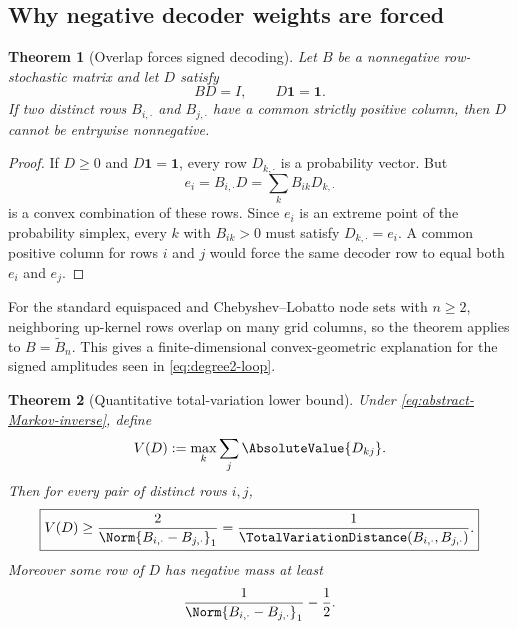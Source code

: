 \documentclass[11pt,oneside]{article}
\numberwithin{equation}{section}
\newtheorem{theorem}{Theorem}[section]
\theoremstyle{definition}
\theoremstyle{remark}
\begin{document}
\subsection{Why negative decoder weights are forced}

\begin{theorem}[Overlap forces signed decoding]
\label{thm:sign-necessity}
Let $B$ be a nonnegative row-stochastic matrix and let $D$ satisfy
\begin{equation}
 BD=I,
 \qquad D\bm1=\bm1.
 \label{eq:abstract-Markov-inverse}
\end{equation}
If two distinct rows $B_{i,\cdot}$ and $B_{j,\cdot}$ have a common strictly
positive column, then $D$ cannot be entrywise nonnegative.
\end{theorem}

\begin{proof}
If $D\ge0$ and $D\bm1=\bm1$, every row $D_{k,\cdot}$ is a probability
vector.  But
\[
 e_i=B_{i,\cdot}D=\sum_kB_{ik}D_{k,\cdot}
\]
is a convex combination of these rows.  Since $e_i$ is an extreme point of
the probability simplex, every $k$ with $B_{ik}>0$ must satisfy
$D_{k,\cdot}=e_i$.  A common positive column for rows $i$ and $j$ would force
the same decoder row to equal both $e_i$ and $e_j$.
\end{proof}

For the standard equispaced and Chebyshev--Lobatto node sets with $n\ge2$,
neighboring up-kernel rows overlap on many grid columns, so the theorem
applies to $B=\widetilde B_n$.  This gives a finite-dimensional convex-geometric
explanation for the signed amplitudes seen in \eqref{eq:degree2-loop}.

\begin{theorem}[Quantitative total-variation lower bound]
\label{thm:TV-bound}
Under \eqref{eq:abstract-Markov-inverse}, define
\begin{equation}
 V(D):=\max_k\sum_j\AbsoluteValue{D_{kj}}.
 \label{eq:decoder-variation}
\end{equation}
Then for every pair of distinct rows $i,j$,
\begin{equation}
 \boxed{
 V(D)\ge\frac{2}{\Norm{B_{i,\cdot}-B_{j,\cdot}}_1}
 =\frac1{\TotalVariationDistance(B_{i,\cdot},B_{j,\cdot})}.
 }
 \label{eq:TV-lower}
\end{equation}
Moreover some row of $D$ has negative mass at least
\begin{equation}
 \frac1{\Norm{B_{i,\cdot}-B_{j,\cdot}}_1}-\frac12.
 \label{eq:negative-mass-lower}
\end{equation}
\end{theorem}
\end{document}
